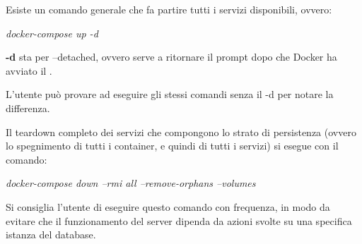 \documentclass[../manuale-sviluppatore.tex]{subfiles}
\begin{document}
Esiste un comando generale che fa partire tutti i servizi disponibili, ovvero: \par\bigskip

\begin{center}
  \textit{docker-compose up -d}
\end{center}
\par\bigskip

\textbf{-d}  sta per --detached, ovvero serve a ritornare il prompt dopo che Docker ha avviato il .

L'utente può provare ad eseguire gli stessi comandi senza il -d per notare la differenza.

Il teardown completo dei servizi che compongono lo strato di persistenza (ovvero lo spegnimento di tutti i container, e quindi di tutti i servizi) si esegue con il comando: \par\bigskip

\begin{center}
  \textit{docker-compose down --rmi all --remove-orphans --volumes}
\end{center}
\par\bigskip

Si consiglia l'utente di eseguire questo comando con frequenza, in modo da evitare che il funzionamento del server dipenda da azioni svolte su una specifica istanza del database.
\end{document}
